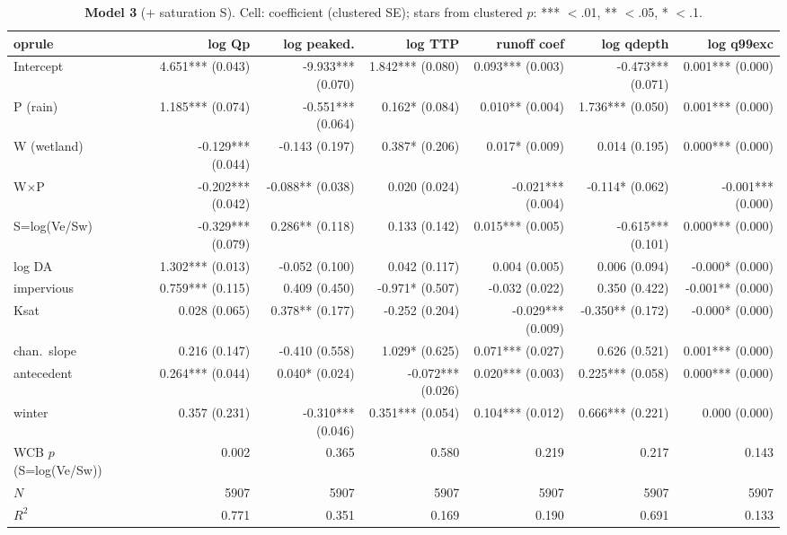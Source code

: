 \documentclass[10pt]{article}
\begin{document}
\begin{landscape}\begin{table}[htbp]\centering
\caption{\textbf{Model 3} (+ saturation S). Cell: coefficient (clustered SE); stars from clustered $p$: *** $<$.01, ** $<$.05, * $<$.1.}
\scriptsize\begin{tabular}{lrrrrrr}	oprule
 & \textbf{log Qp} & \textbf{log peaked.} & \textbf{log TTP} & \textbf{runoff coef} & \textbf{log qdepth} & \textbf{log q99exc} \\ \midrule
Intercept & 4.651*** (0.043) & -9.933*** (0.070) & 1.842*** (0.080) & 0.093*** (0.003) & -0.473*** (0.071) & 0.001*** (0.000) \\
P (rain) & 1.185*** (0.074) & -0.551*** (0.064) & 0.162* (0.084) & 0.010** (0.004) & 1.736*** (0.050) & 0.001*** (0.000) \\
W (wetland) & -0.129*** (0.044) & -0.143 (0.197) & 0.387* (0.206) & 0.017* (0.009) & 0.014 (0.195) & 0.000*** (0.000) \\
W$\times$P & -0.202*** (0.042) & -0.088** (0.038) & 0.020 (0.024) & -0.021*** (0.004) & -0.114* (0.062) & -0.001*** (0.000) \\
S=log(Ve/Sw) & -0.329*** (0.079) & 0.286** (0.118) & 0.133 (0.142) & 0.015*** (0.005) & -0.615*** (0.101) & 0.000*** (0.000) \\
log DA & 1.302*** (0.013) & -0.052 (0.100) & 0.042 (0.117) & 0.004 (0.005) & 0.006 (0.094) & -0.000* (0.000) \\
impervious & 0.759*** (0.115) & 0.409 (0.450) & -0.971* (0.507) & -0.032 (0.022) & 0.350 (0.422) & -0.001** (0.000) \\
Ksat & 0.028 (0.065) & 0.378** (0.177) & -0.252 (0.204) & -0.029*** (0.009) & -0.350** (0.172) & -0.000* (0.000) \\
chan.\ slope & 0.216 (0.147) & -0.410 (0.558) & 1.029* (0.625) & 0.071*** (0.027) & 0.626 (0.521) & 0.001*** (0.000) \\
antecedent & 0.264*** (0.044) & 0.040* (0.024) & -0.072*** (0.026) & 0.020*** (0.003) & 0.225*** (0.058) & 0.000*** (0.000) \\
winter & 0.357 (0.231) & -0.310*** (0.046) & 0.351*** (0.054) & 0.104*** (0.012) & 0.666*** (0.221) & 0.000 (0.000) \\
\midrule
WCB $p$ (S=log(Ve/Sw)) & 0.002 & 0.365 & 0.580 & 0.219 & 0.217 & 0.143 \\
$N$ & 5907 & 5907 & 5907 & 5907 & 5907 & 5907 \\
$R^2$ & 0.771 & 0.351 & 0.169 & 0.190 & 0.691 & 0.133 \\
\bottomrule\end{tabular}
\end{table}\end{landscape}
\end{document}
